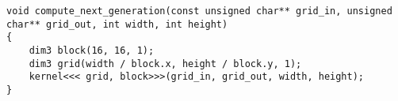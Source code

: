 \begin{lstlisting}
void compute_next_generation(const unsigned char** grid_in, unsigned char** grid_out, int width, int height)
{
	dim3 block(16, 16, 1);
	dim3 grid(width / block.x, height / block.y, 1);
	kernel<<< grid, block>>>(grid_in, grid_out, width, height);
}
\end{lstlisting}
